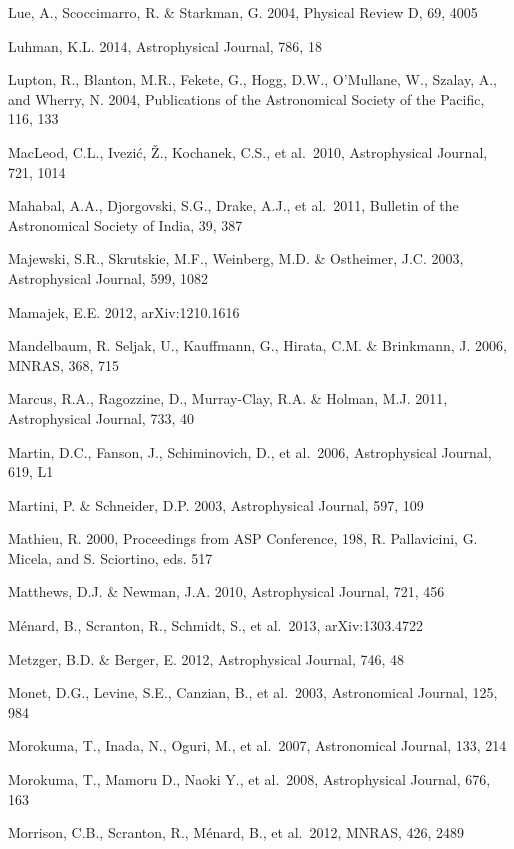 \documentclass{emulateapj}
\begin{document}
\begin{thebibliography}{}
\bibitem[()]{} Lue, A., Scoccimarro, R. \& Starkman, G. 2004, Physical Review D, 69, 4005

\bibitem[()]{} Luhman, K.L. 2014,  Astrophysical Journal, 786, 18 

\bibitem[()]{} Lupton, R., Blanton, M.R., Fekete, G., Hogg, D.W.,
  O'Mullane, W., Szalay, A., and Wherry, N. 2004, Publications of the
  Astronomical Society of the Pacific, 116, 133

\bibitem[()]{} MacLeod, C.L., Ivezi\'{c}, \v{Z}., Kochanek, C.S., et al.~2010, Astrophysical Journal, 721, 1014

\bibitem[()]{} Mahabal, A.A., Djorgovski, S.G., Drake, A.J., et al.~2011, Bulletin of the Astronomical Society of India, 39, 387

\bibitem[()]{} Majewski, S.R., Skrutskie, M.F., Weinberg, M.D. \& Ostheimer, J.C. 2003, 
             Astrophysical Journal, 599, 1082

\bibitem[()]{} Mamajek, E.E. 2012, arXiv:1210.1616

\bibitem[()]{} Mandelbaum, R. Seljak, U., Kauffmann, G., Hirata, C.M. \& Brinkmann, J. 2006, MNRAS, 368, 715

\bibitem[()]{} Marcus, R.A., Ragozzine, D., Murray-Clay, R.A. \& Holman, M.J. 2011, Astrophysical Journal, 733, 40

\bibitem[()]{} Martin, D.C., Fanson, J., Schiminovich, D., et al.~2006, Astrophysical Journal, 619, L1

\bibitem[()]{} Martini, P. \& Schneider, D.P. 2003, Astrophysical Journal, 597, 109

\bibitem[()]{} Mathieu, R. 2000, Proceedings from ASP Conference, 198, R. Pallavicini, G. Micela, and 
             S. Sciortino, eds. 517

\bibitem[()]{} Matthews, D.J. \& Newman, J.A. 2010, Astrophysical Journal, 721, 456

\bibitem[()]{} M\'{e}nard, B., Scranton, R., Schmidt, S., et al.~2013, arXiv:1303.4722

\bibitem[()]{} Metzger, B.D. \& Berger, E. 2012, Astrophysical Journal, 746, 48

\bibitem[()]{} Monet, D.G., Levine, S.E., Canzian, B., et al.~2003, Astronomical Journal, 125, 984

\bibitem[()]{} Morokuma, T., Inada, N., Oguri, M., et al.~2007, Astronomical Journal, 133, 214

\bibitem[()]{} Morokuma, T., Mamoru D., Naoki Y., et al.~2008, Astrophysical Journal, 676, 163	

\bibitem[()]{} Morrison, C.B., Scranton, R., M\'{e}nard, B., et al.~2012, MNRAS, 426, 2489


\end{thebibliography}
\end{document}
